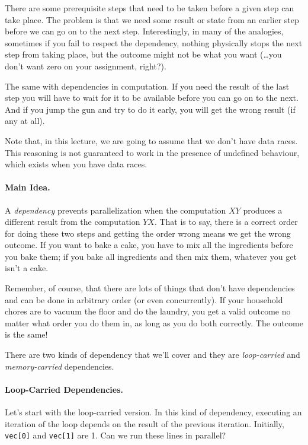 \documentclass[a4paper]{report}
\begin{document}
There are some prerequisite steps that need to be taken before a given step can take place. The problem is that we need some result or state from an earlier step before we can go on to the next step. Interestingly, in many of the analogies, sometimes if you fail to respect the dependency, nothing physically stops the next step from taking place, but the outcome might not be what you want (\ldots you don't want zero on your assignment, right?).

The same with dependencies in computation. If you need the result of the last step you will have to wait for it to be available before you can go on to the next. And if you jump the gun and try to do it early, you will get the wrong result (if any at all). 

Note that, in this lecture, we are going to assume that we don't have data races. This reasoning is not guaranteed to work in the presence of undefined behaviour, which exists when you have data races.

\paragraph{Main Idea.} A \emph{dependency} prevents parallelization
when the computation $XY$ produces a different result from the
computation $YX$. That is to say, there is a correct order for doing these two steps and getting the order wrong means we get the wrong outcome. If you want to bake a cake, you have to mix all the ingredients before you bake them; if you bake all ingredients and then mix them, whatever you get isn't a cake.

Remember, of course, that there are lots of things that don't have dependencies and can be done in arbitrary order (or even concurrently). If your household chores are to vacuum the floor and do the laundry, you get a valid outcome no matter what order you do them in, as long as you do both correctly. The outcome is the same!

There are two kinds of dependency that we'll cover and they are \emph{loop-carried} and \emph{memory-carried} dependencies.

\paragraph{Loop-Carried Dependencies.} Let's start with the loop-carried version. In this kind of dependency, executing an iteration of the loop depends on the result of the previous iteration. Initially, {\tt vec[0]} and {\tt vec[1]} are 1. Can we run these lines in parallel?
\end{document}
